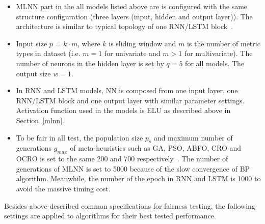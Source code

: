 \documentclass[smallcondensed, natbib]{svjour3}     %
\begin{document}
\begin{itemize}
\item MLNN part in the all models listed above are is configured with the same structure configuration (three layers (input, hidden and output layer)). The architecture is similar to typical topology of one RNN/LSTM block~\citep{ref_xiaolei}. 
\item Input size $p$ = $k \cdot m$, where $k$ is sliding window and $m$ is the number of metric types in dataset (i.e. $m=1$ for univariate and $m>1$ for multivariate). The number of neurons in the hidden layer is set by $q=5$ for all models. The output size $w=1$. 
\item In RNN and LSTM models, NN is composed from one input layer, one RNN/LSTM block and one output layer with similar parameter settings. Activation function used in the models is ELU as described above in Section~\ref{mlnn}.
\item To be fair in all test, the population size $p_s$ and maximum number of generations $g_{max}$ of meta-heuristics such as GA, PSO, ABFO, CRO and OCRO is set to the same 200 and 700 respectively~\citep{ref_thieu}. The number of generations of MLNN is set to 5000 because of the slow convergence of BP algorithm. Meanwhile, the number of the epoch in RNN and LSTM is 1000 to avoid the massive timing cost.
\end{itemize}

Besides above-described common specifications for fairness testing, the following settings are applied to algorithms for their best tested performance.
\end{document}
